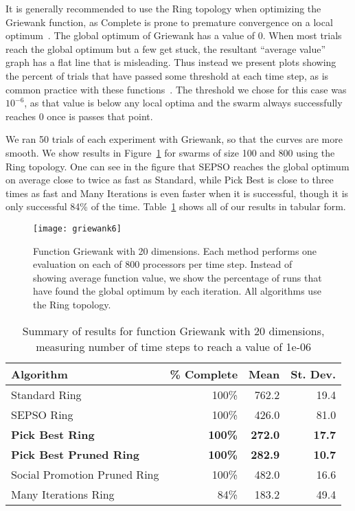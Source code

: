 \documentclass[ms,electronic,twosidetoc,letterpaper,chaptercenter,parttop,equalmargins]{byumsphd}
\newcommand{\fig}[1]{Figure~\ref{fig:#1}}
\newcommand{\tabref}[1]{Table~\ref{tab:#1}}
\begin{document}
It is generally recommended to use the Ring topology when optimizing the
Griewank function, as Complete is prone to premature convergence on a local
optimum~\citep{bratton-2007-defining-a-standard-for-pso}.  The global optimum
of Griewank has a value of 0.  When most trials reach the global optimum but a
few get stuck, the resultant ``average value'' graph has a flat line that is
misleading.  Thus instead we present plots showing the percent of trials that
have passed some threshold at each time step, as is common practice with these
functions~\citep{mendes-2004-population-topologies-in-pso}.  The threshold we
chose for this case was $10^{-6}$, as that value is below any local optima and
the swarm always successfully reaches 0 once is passes that point.

We ran 50 trials of each experiment with Griewank, so that the curves are more
smooth.  We show results in \fig{basic-griewank1} for swarms of size 100 and
800 using the Ring topology.  One can see in the figure that SEPSO reaches the
global optimum on average close to twice as fast as Standard, while Pick Best
is close to three times as fast and Many Iterations is even faster when it is
successful, though it is only successful 84\% of the time.
\tabref{griewank-20} shows all of our results in tabular form.

\begin{figure}
  \centering
  \texttt{[image: griewank6]}
  \caption{Function Griewank with 20 dimensions.  Each method performs one
  evaluation on each of 800 processors per time step.  Instead of showing
  average function value, we show the percentage of runs that have found the
  global optimum by each iteration.  All algorithms use the Ring topology.}
  \label{fig:basic-griewank1}
\end{figure}

\begin{table}
  \caption{Summary of results for function Griewank with 20 dimensions,
  measuring number of time steps to reach a value of 1e-06}
  \label{tab:griewank-20}
  \centering
  \begin{tabular}{|l|r|r|r|}
  \hline
  Algorithm&\% Complete&Mean&St. Dev.\\
  \hline
  \hline
  Standard Ring&100\%&762.2&19.4\\
  \hline
  SEPSO Ring&100\%&426.0&81.0\\
  \hline
  \textbf{Pick Best Ring}&\textbf{100\%}&\textbf{272.0}&\textbf{17.7}\\
  \hline
  \textbf{Pick Best Pruned Ring}&\textbf{100\%}&\textbf{282.9}&\textbf{10.7}\\
  \hline
  Social Promotion Pruned Ring&100\%&482.0&16.6\\
  \hline
  Many Iterations Ring&84\%&183.2&49.4\\
  \hline
  \end{tabular}
\end{table}
\end{document}

